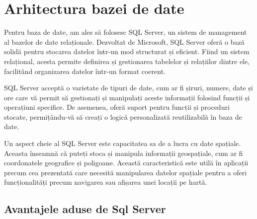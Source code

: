\section{Arhitectura bazei de date}


Pentru baza de date, am ales să folosesc SQL Server, un sistem de management al bazelor de date relaționale. Dezvoltat de Microsoft, SQL Server oferă o bază solidă pentru stocarea datelor într-un mod structurat și eficient. Fiind un sistem relațional, acesta permite definirea și gestionarea tabelelor și relațiilor dintre ele, facilitând organizarea datelor într-un format coerent.

SQL Server acceptă o varietate de tipuri de date, cum ar fi șiruri, numere, date și ore care vă permit să gestionați și manipulați aceste informații folosind funcții și operațiuni specifice. De asemenea, oferă suport pentru funcții și proceduri stocate, permițându-vă să creați o logică personalizată reutilizabilă în baza de date.

Un aspect cheie al SQL Server este capacitatea sa de a lucra cu date spațiale. Aceasta înseamnă că puteți stoca și manipula informații geospațiale, cum ar fi coordonatele geografice și poligoane. Această caracteristică este utilă în aplicații precum cea prezentată care necesită manipularea datelor spațiale pentru a oferi funcționalități precum navigarea sau afișarea unei locații pe hartă.

\subsection{Avantajele aduse de Sql Server}

